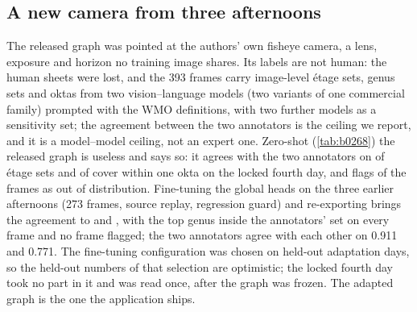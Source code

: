 \subsection{A new camera from three afternoons}
\label{sec:b0268}

The released graph was pointed at the authors' own fisheye camera, a lens, exposure and horizon no training image
shares. Its labels are not human: the human sheets were lost, and the 393 frames carry image-level \'etage sets,
genus sets and oktas from two vision--language models (two variants of one commercial family) prompted with the
WMO definitions, with two further models as a sensitivity set; the agreement between the two annotators is the
ceiling we report, and it is a model--model ceiling, not an expert one. Zero-shot (\cref{tab:b0268}) the released
graph is useless and says so: it agrees with the two annotators on \nZsEtage{} of \'etage sets and \nZsOktas{} of
cover within one okta on the locked fourth day, and flags \nZsOod{} of the frames as out of distribution.
Fine-tuning the global heads on the three earlier afternoons (273 frames, source replay, regression guard) and
re-exporting brings the agreement to \nAdEtage{} and \nAdOktas{}, with the top genus inside the annotators' set on
every frame and no frame flagged; the two annotators agree with each other on 0.911 and 0.771. The fine-tuning
configuration was chosen on held-out adaptation days, so the held-out numbers of that selection are optimistic;
the locked fourth day took no part in it and was read once, after the graph was frozen. The adapted graph is the
one the application ships.
